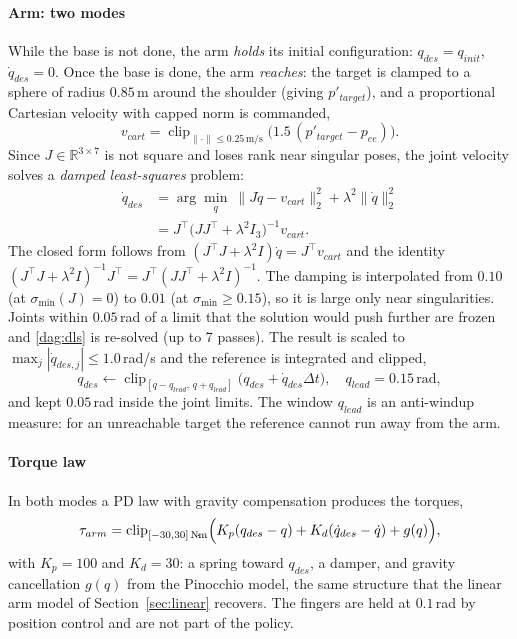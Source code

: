 \documentclass[conference]{IEEEtran}
\newcommand{\dagnorm}[1]{\lVert #1\rVert_2}            %
\newcommand{\dagNm}{\mathrm{N\!\cdot\!m}}              %
\begin{document}
\paragraph{Arm: two modes} While the base is not done, the arm \emph{holds} its initial configuration: $q_{des}=q_{init}$, $\dot q_{des}=0$. Once the base is done, the arm \emph{reaches}: the target is clamped to a sphere of radius $0.85$\,m around the shoulder (giving $p'_{target}$), and a proportional Cartesian velocity with capped norm is commanded,
\begin{equation}
  v_{cart}=\operatorname{clip}_{\lVert\cdot\rVert\le0.25\,\text{m/s}}\bigl(1.5\,(p'_{target}-p_{ee})\bigr).
  \label{dag:vcart}
\end{equation}
Since $J\in\mathbb{R}^{3\times7}$ is not square and loses rank near singular poses, the joint velocity solves a \emph{damped least-squares} problem:
\begin{equation}
\begin{aligned}
  \dot q_{des}&=\arg\min_{\dot q}\ \dagnorm{J\dot q-v_{cart}}^{2}+\lambda^{2}\dagnorm{\dot q}^{2}\\
  &=J^{\top}\bigl(JJ^{\top}+\lambda^{2}I_3\bigr)^{-1}v_{cart}.
\end{aligned}
\label{dag:dls}
\end{equation}
The closed form follows from $(J^{\top}J+\lambda^{2}I)\dot q=J^{\top}v_{cart}$ and the identity $(J^{\top}J+\lambda^{2}I)^{-1}J^{\top}=J^{\top}(JJ^{\top}+\lambda^{2}I)^{-1}$. The damping is interpolated from $0.10$ (at $\sigma_{\min}(J)=0$) to $0.01$ (at $\sigma_{\min}\ge0.15$), so it is large only near singularities. Joints within $0.05$\,rad of a limit that the solution would push further are frozen and \eqref{dag:dls} is re-solved (up to 7 passes). The result is scaled to $\max_j|\dot q_{des,j}|\le1.0$\,rad/s and the reference is integrated and clipped,
\begin{equation}
  q_{des}\leftarrow\operatorname{clip}_{[q-q_{lead},\,q+q_{lead}]}\bigl(q_{des}+\dot q_{des}\Delta t\bigr),\quad q_{lead}=0.15\,\text{rad},
\label{dag:qlead}
\end{equation}
and kept $0.05$\,rad inside the joint limits. The window $q_{lead}$ is an anti-windup measure: for an unreachable target the reference cannot run away from the arm.

\paragraph{Torque law} In both modes a PD law with gravity compensation produces the torques,
\begin{equation}
  \tau_{arm}=\operatorname{clip}_{[-30,30]\,\dagNm}\Bigl(K_p(q_{des}-q)+K_d(\dot q_{des}-\dot q)+g(q)\Bigr),
  \label{dag:pd}
\end{equation}
with $K_p=100$ and $K_d=30$: a spring toward $q_{des}$, a damper, and gravity cancellation $g(q)$ from the Pinocchio model, the same structure that the linear arm model of Section~\ref{sec:linear} recovers. The fingers are held at $0.1$\,rad by position control and are not part of the policy.
\end{document}
